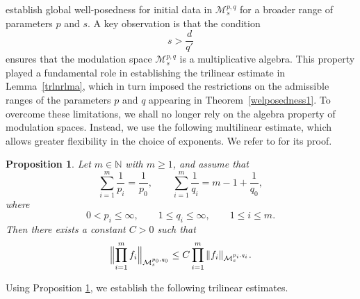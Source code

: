\documentclass[12pt,reqno,a4paper]{amsart}
\numberwithin{equation}{section}
\theoremstyle{plain}
\newtheorem{proposition}[theorem]{Proposition}
\theoremstyle{definition}
\theoremstyle{remark}
\def\M{\mathcal{M}}
\def \M{{\mathcal M}}
\begin{document}
establish global well-posedness for initial data in $\M^{p,q}_{s}$
for a broader range of parameters $p$ and $s$.
A key observation is that the condition
\[
s>\frac{d}{q'}
\]
ensures that the modulation space $\M^{p,q}_{s}$ is a multiplicative
algebra. This property played a fundamental role in establishing the trilinear estimate in Lemma~\ref{trlnrlma}, which in turn imposed the restrictions on the admissible ranges of the parameters \(p\) and \(q\) appearing in Theorem~\ref{welposedness1}.
To overcome these limitations, we shall no longer rely on the algebra
property of modulation spaces. Instead, we use the following multilinear
estimate, which allows greater flexibility in the choice of exponents.
We refer to
\cite{feichtinger1983modulation, MR2204673, MR2506839}
for its proof.

\begin{proposition}
\label{algebraproposition}
Let $m\in\mathbb{N}$ with $m\geq 1$, and assume that
\[
\sum_{i=1}^{m}\frac{1}{p_{i}}
=
\frac{1}{p_{0}},
\qquad
\sum_{i=1}^{m}\frac{1}{q_{i}}
=
m-1+\frac{1}{q_{0}},
\]
where
\[
0<p_{i}\leq\infty,
\qquad
1\leq q_{i}\leq\infty,
\qquad
1\leq i\leq m.
\]
Then there exists a constant $C>0$ such that
\[
\Bigl\|
\prod_{i=1}^{m}f_{i}
\Bigr\|_{\M^{p_{0},q_{0}}_{s}}
\leq
C
\prod_{i=1}^{m}
\|f_{i}\|_{\M^{p_{i},q_{i}}_{s}}.
\]
\end{proposition}

Using Proposition \ref{algebraproposition}, we establish the following
trilinear estimates.
\end{document}
